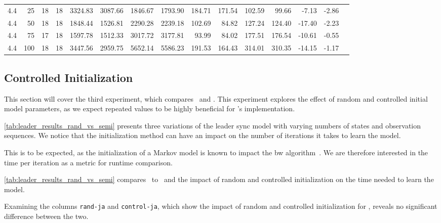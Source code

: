 \begin{table*}
\begin{tabular}{rrrrrrrrrrrrrrr}
        4.4           & 25  & 18      & 18      & 3324.83     & 3087.66     & 1846.67    & 1793.90    & 184.71        & 171.54        & 102.59       & 99.66        & -7.13        & -2.86       \\
        4.4           & 50  & 18      & 18      & 1848.44     & 1526.81     & 2290.28    & 2239.18    & 102.69        & 84.82         & 127.24       & 124.40       & -17.40       & -2.23       \\
        4.4           & 75  & 17      & 18      & 1597.78     & 1512.33     & 3017.72    & 3177.81    & 93.99         & 84.02         & 177.51       & 176.54       & -10.61       & -0.55       \\
        4.4           & 100 & 18      & 18      & 3447.56     & 2959.75     & 5652.14    & 5586.23    & 191.53        & 164.43        & 314.01       & 310.35       & -14.15       & -1.17       \\
        \bottomrule
    \end{tabular}
\end{table*}


\subsection{Controlled Initialization}\label{subsec:controled_initialization}
This section will cover the third experiment, which compares \Cupaal\ and \Jajapy.
This experiment explores the effect of random and controlled initial model parameters, as we expect repeated values to be highly beneficial for \Cupaal’s implementation.

\autoref{tab:leader_results_rand_vs_semi} presents three variations of the leader sync model with varying numbers of states and observation sequences.
We notice that the initialization method can have an impact on the number of iterations it takes to learn the model.

This is to be expected, as the initialization of a Markov model is known to impact the \gls{bw} algorithm~\cite{Rabiner89}.
We are therefore interested in the time per iteration as a metric for runtime comparison.

\autoref{tab:leader_results_rand_vs_semi} compares \Cupaal\ to \Jajapy\ and the impact of random and controlled initialization on the time needed to learn the model.

Examining the columns \texttt{rand-ja} and \texttt{control-ja}, which show the impact of random and controlled initialization for \Jajapy, reveals no significant difference between the two.

